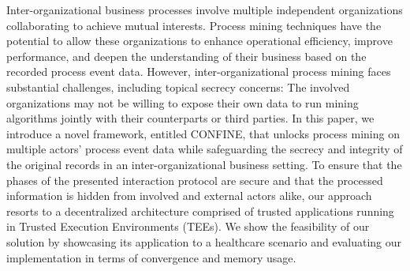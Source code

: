 Inter-organizational business processes involve multiple independent organizations collaborating to achieve mutual interests. 
Process mining techniques have the potential to allow these organizations to enhance operational efficiency, improve performance, and deepen the understanding of their business based on the recorded process event data. 
However, inter-organizational process mining faces substantial challenges, including topical secrecy concerns: The involved organizations may not be willing to expose their own data to run mining algorithms jointly with their counterparts or third parties. 
In this paper, we introduce a novel framework, entitled CONFINE, that unlocks process mining on multiple actors' process event data while safeguarding the secrecy and integrity of the original records in an inter-organizational business setting.
To ensure that the phases of the presented interaction protocol are secure and that the processed information is hidden from involved and external actors alike, our approach resorts to a decentralized architecture comprised of trusted applications running in Trusted Execution Environments (TEEs). We show the feasibility of our solution by showcasing its application to a healthcare scenario and evaluating our implementation in terms of convergence and memory usage.
%
\begin{comment}%
 Through process mining tecniques, organizations enhances their operational efficiency, improve performances, and deepen the understanding of their business processes. While most process mining research focuses on intra-organizational settings, the emerging importance of inter-organizational collaborations for operational excellence cannot be ignored. Inter-organizational business processes involve multiple independent organizations collaborating to achieve mutual interests. However, inter-organizational process mining faces substantial challenges, primarily centered on confidentiality concerns. In this paper, we introduce a novel approach based on the adoption of trusted applications running in Trusted Execution Environments (TEEs). Our research work aims at ensuring privacy preservation and safeguarding the integrity of sensitive information during process mining procedures in inter-organizational contexts. Therefore, we introduce a TEE-based infrastructure supporting the execution of trusted applications through which partner organizations securely share operational information and apply process mining techniques. We show the feasibility of our solution by exposing an healthcare scenario that serve as running example. Our contribution includes a discussion of the proposed research work that addresses strengths and areas for improvement.
\end{comment}
